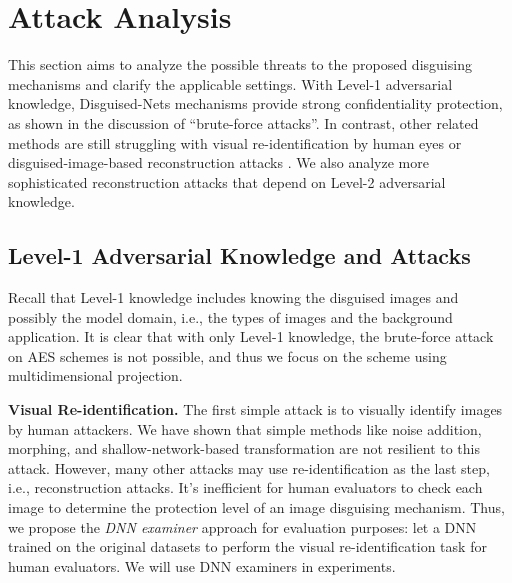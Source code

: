 \documentclass[conference]{IEEEtran}
\begin{document}
\section{Attack Analysis}\label{sec:security_analysis}
This section aims to analyze the possible threats to the proposed disguising mechanisms and clarify the applicable settings. With Level-1 adversarial knowledge, Disguised-Nets mechanisms provide strong confidentiality protection, as shown in the discussion of ``brute-force attacks''. In contrast, other related methods are still struggling with visual re-identification by human eyes \cite{li17,fan18} or disguised-image-based reconstruction attacks \cite{carlini21}. We also analyze more sophisticated reconstruction attacks that depend on Level-2 adversarial knowledge. 

\subsection{Level-1 Adversarial Knowledge and Attacks}
Recall that Level-1 knowledge includes knowing the disguised images and possibly the model domain, i.e., the types of images and the background application. It is clear that with only Level-1 knowledge, the brute-force attack on AES schemes is not possible, and thus we focus on the scheme using multidimensional projection. 

\textbf{Visual Re-identification.} The first simple attack is to visually identify images by human attackers. We have shown that simple methods like noise addition, morphing, and shallow-network-based transformation are not resilient to this attack. However, many other attacks may use re-identification as the last step, i.e., reconstruction attacks. It's inefficient for human evaluators to check each image to determine the protection level of an image disguising mechanism. Thus, we propose the \emph{DNN examiner} approach for evaluation purposes: let a DNN trained on the original datasets to perform the visual re-identification task for human evaluators. We will use DNN examiners in experiments. 
\end{document}
